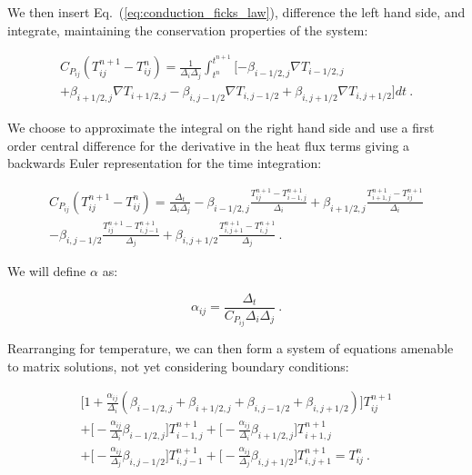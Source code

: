 \documentclass[letterpaper,12pt]{article}
\begin{document}
We then insert Eq.~(\ref{eq:conduction_ficks_law}), difference the
left hand side, and integrate, maintaining the conservation properties
of the system:

\begin{multline}
  C_{P_{ij}} ( T^{n+1}_{ij} - T^n_{ij} ) = \frac{1}{\Delta_i \Delta_j}
  \int_{t^n}^{t^{n+1}} [ -\beta_{i-1/2,j} \nabla T_{i-1/2,j}\\
    + \beta_{i+1/2,j} \nabla T_{i+1/2,j} - \beta_{i,j-1/2} \nabla
    T_{i,j-1/2} +\beta_{i,j+1/2} \nabla T_{i,j+1/2} ] dt\:.
  \label{eq:conduction_time_integral}
\end{multline}

We choose to approximate the integral on the right hand side and use a
first order central difference for the derivative in the heat flux
terms giving a backwards Euler representation for the time
integration:

\begin{multline}
  C_{P_{ij}}( T^{n+1}_{ij} - T^n_{ij} ) = \frac{\Delta_t}{\Delta_i
    \Delta_j} -\beta_{i-1/2,j} \frac{T^{n+1}_{ij}
    -T^{n+1}_{i-1,j}}{\Delta_i} +\beta_{i+1/2,j} \frac{T^{n+1}_{i+1,j}
    -T^{n+1}_{ij}}{\Delta_i}\\
  -\beta_{i,j-1/2} \frac{T^{n+1}_{ij}
    -T^{n+1}_{i,j-1}}{\Delta_j} +\beta_{i,j+1/2} \frac{T^{n+1}_{i,j+1}
    -T^{n+1}_{i,j}}{\Delta_j}\:.
  \label{eq:conduction_fv_multline}
\end{multline}

We will define $\alpha$ as:

\begin{equation}
  \alpha_{ij} = \frac{\Delta_t}{C_{P_{ij}} \Delta_i \Delta_j}\:.
  \label{eq:conduction_coeff}
\end{equation}

Rearranging for temperature, we can then form a system of equations
amenable to matrix solutions, not yet considering boundary conditions:

\begin{multline}
 \Big[1 + \frac{\alpha_{ij}}{\Delta_i}(\beta_{i-1/2,j} +
   \beta_{i+1/2,j} + \beta_{i,j-1/2} + \beta_{i,j+1/2})\Big]
 T^{n+1}_{ij} \\
 + \Big[-\frac{\alpha_{ij}}{\Delta_i}
   \beta_{i-1/2,j}\Big] T^{n+1}_{i-1,j}
 + \Big[-\frac{\alpha_{ij}}{\Delta_i} \beta_{i+1/2,j}\Big]
 T^{n+1}_{i+1,j} \\
 + \Big[-\frac{\alpha_{ij}}{\Delta_j}
   \beta_{i,j-1/2}\Big] T^{n+1}_{i,j-1} +
 \Big[-\frac{\alpha_{ij}}{\Delta_j} \beta_{i,j+1/2}\Big]
 T^{n+1}_{i,j+1} = T^n_{ij}\:.
 \label{eq:conduction_inner_terms}
\end{multline}
\end{document}
